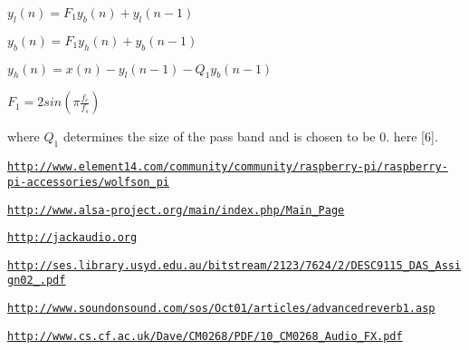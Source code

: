 $y_l(n) = F_1y_b(n) + y_l(n-1)$ \par
 $y_b(n) = F_1y_h(n) + y_b(n-1)$ \par
 $y_h(n) = x(n) - y_l(n-1) - Q_1y_b(n-1)$ \par
 $F_1 = 2sin(\pi \frac{f_c}{f_s})$

where $Q_1$ determines the size of the pass band and is chosen to be 0. here \mbox{[}6\mbox{]}.


\begin{DoxyEnumerate}
\item \href{http://www.element14.com/community/community/raspberry-pi/raspberry-pi-accessories/wolfson_pi}{\tt http\+://www.\+element14.\+com/community/community/raspberry-\/pi/raspberry-\/pi-\/accessories/wolfson\+\_\+pi}
\item \href{http://www.alsa-project.org/main/index.php/Main_Page}{\tt http\+://www.\+alsa-\/project.\+org/main/index.\+php/\+Main\+\_\+\+Page}
\item \href{http://jackaudio.org}{\tt http\+://jackaudio.\+org}
\item \href{http://ses.library.usyd.edu.au/bitstream/2123/7624/2/DESC9115_DAS_Assign02_310106370.pdf}{\tt http\+://ses.\+library.\+usyd.\+edu.\+au/bitstream/2123/7624/2/\+D\+E\+S\+C9115\+\_\+\+D\+A\+S\+\_\+\+Assign02\+\_.\+pdf}
\item \href{http://www.soundonsound.com/sos/Oct01/articles/advancedreverb1.asp}{\tt http\+://www.\+soundonsound.\+com/sos/\+Oct01/articles/advancedreverb1.\+asp}
\item \href{http://www.cs.cf.ac.uk/Dave/CM0268/PDF/10_CM0268_Audio_FX.pdf}{\tt http\+://www.\+cs.\+cf.\+ac.\+uk/\+Dave/\+C\+M0268/\+P\+D\+F/10\+\_\+\+C\+M0268\+\_\+\+Audio\+\_\+\+F\+X.\+pdf} 
\end{DoxyEnumerate}